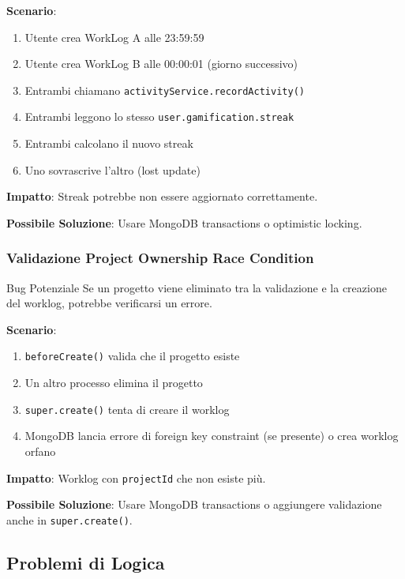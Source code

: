 \documentclass[11pt,a4paper]{article}
\begin{document}
\textbf{Scenario}:
\begin{enumerate}
    \item Utente crea WorkLog A alle 23:59:59
    \item Utente crea WorkLog B alle 00:00:01 (giorno successivo)
    \item Entrambi chiamano \texttt{activityService.recordActivity()}
    \item Entrambi leggono lo stesso \texttt{user.gamification.streak}
    \item Entrambi calcolano il nuovo streak
    \item Uno sovrascrive l'altro (lost update)
\end{enumerate}

\textbf{Impatto}: Streak potrebbe non essere aggiornato correttamente.

\textbf{Possibile Soluzione}: Usare MongoDB transactions o optimistic locking.

\subsubsection{Validazione Project Ownership Race Condition}

\begin{warningbox}{Bug Potenziale}
Se un progetto viene eliminato tra la validazione e la creazione del worklog, potrebbe verificarsi un errore.
\end{warningbox}

\textbf{Scenario}:
\begin{enumerate}
    \item \texttt{beforeCreate()} valida che il progetto esiste
    \item Un altro processo elimina il progetto
    \item \texttt{super.create()} tenta di creare il worklog
    \item MongoDB lancia errore di foreign key constraint (se presente) o crea worklog orfano
\end{enumerate}

\textbf{Impatto}: Worklog con \texttt{projectId} che non esiste più.

\textbf{Possibile Soluzione}: Usare MongoDB transactions o aggiungere validazione anche in \texttt{super.create()}.

\subsection{Problemi di Logica}
\end{document}
